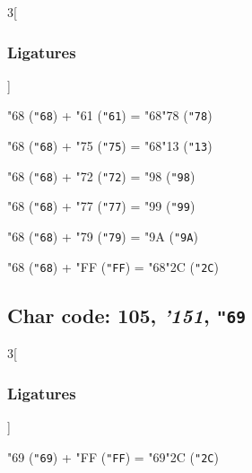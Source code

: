 \documentclass{article}
\newlength{\maxcharwidth}
\begin{document}
\begin{multicols}{3}[\subsubsection{Ligatures}]

{\testfont\char"68\noboundary} ({\tt"68}) + {\testfont\char"61\noboundary} ({\tt"61}) = {\testfont\char"68\noboundary}{\testfont\char"78\noboundary} ({\tt"78}) 

{\testfont\char"68\noboundary} ({\tt"68}) + {\testfont\char"75\noboundary} ({\tt"75}) = {\testfont\char"68\noboundary}{\testfont\char"13\noboundary} ({\tt"13}) 

{\testfont\char"68\noboundary} ({\tt"68}) + {\testfont\char"72\noboundary} ({\tt"72}) = {\testfont\char"98\noboundary} ({\tt"98}) 

{\testfont\char"68\noboundary} ({\tt"68}) + {\testfont\char"77\noboundary} ({\tt"77}) = {\testfont\char"99\noboundary} ({\tt"99}) 

{\testfont\char"68\noboundary} ({\tt"68}) + {\testfont\char"79\noboundary} ({\tt"79}) = {\testfont\char"9A\noboundary} ({\tt"9A}) 

{\testfont\char"68\noboundary} ({\tt"68}) + {\testfont\char"FF\noboundary} ({\tt"FF}) = {\testfont\char"68\noboundary}{\testfont\char"2C\noboundary} ({\tt"2C}) 

\end{multicols}

\subsection{Char code: 105, {\it'151}, {\tt"69}}
\label{char_105}


\begin{multicols}{3}[\subsubsection{Ligatures}]

{\testfont\char"69\noboundary} ({\tt"69}) + {\testfont\char"FF\noboundary} ({\tt"FF}) = {\testfont\char"69\noboundary}{\testfont\char"2C\noboundary} ({\tt"2C}) 

\end{multicols}
\end{document}
